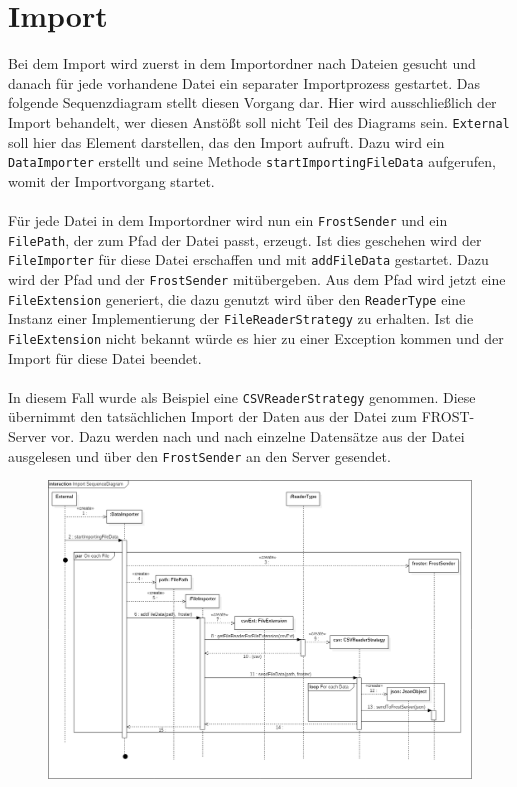 \section{Import}
Bei dem Import wird zuerst in dem Importordner nach Dateien gesucht und danach für jede vorhandene Datei ein separater Importprozess gestartet. Das folgende Sequenzdiagram stellt diesen Vorgang dar. Hier wird ausschließlich der Import behandelt, wer diesen Anstößt soll nicht Teil des Diagrams sein. \texttt{External} soll hier das Element darstellen, das den Import aufruft. Dazu wird ein \texttt{DataImporter} erstellt und seine Methode \texttt{startImportingFileData} aufgerufen, womit der Importvorgang startet.\\\\
Für jede Datei in dem Importordner wird nun ein \texttt{FrostSender} und ein \texttt{FilePath}, der zum Pfad der Datei passt, erzeugt. Ist dies geschehen wird der \texttt{FileImporter} für diese Datei erschaffen und mit \texttt{addFileData} gestartet. Dazu wird der Pfad und der \texttt{FrostSender} mitübergeben. Aus dem Pfad wird jetzt eine \texttt{FileExtension} generiert, die dazu genutzt wird über den \texttt{ReaderType} eine Instanz einer Implementierung der \texttt{FileReaderStrategy} zu erhalten. Ist die \texttt{FileExtension} nicht bekannt würde es hier zu einer Exception kommen und der Import für diese Datei beendet.\\\\
In diesem Fall wurde als Beispiel eine \texttt{CSVReaderStrategy} genommen. Diese übernimmt den tatsächlichen Import der Daten aus der Datei zum FROST-Server vor. Dazu werden nach und nach einzelne Datensätze aus der Datei ausgelesen und über den \texttt{FrostSender} an den Server gesendet.
\begin{figure}[!hbp]
	\centering
	\includegraphics[width=\linewidth]{images/import/ImportSequenceDiagram.png}
\end{figure}
\newpage

